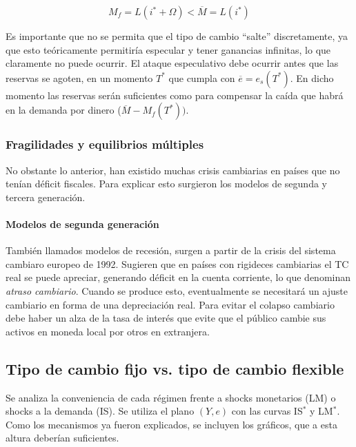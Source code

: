 \documentclass[DeGregorioResumen]{subfiles}
\begin{document}
\begin{equation*}
	M_f = L(i^* + \Omega) < \overline M = L(i^*)
\end{equation*}

Es importante que no se permita que el tipo de cambio ``salte'' discretamente, ya que esto teóricamente permitiría especular y tener ganancias infinitas, lo que claramente no puede ocurrir. El ataque especulativo debe ocurrir antes que las reservas se agoten, en un momento $T^*$ que cumpla con $\overline e = e_s(T^*)$. En dicho momento las reservas serán suficientes como para compensar la caída que habrá en la demanda por dinero ($\overline M - M_f(T^*))$.

\subsubsection{Fragilidades y equilibrios múltiples}

No obstante lo anterior, han existido muchas crisis cambiarias en países que no tenían déficit fiscales. Para explicar esto surgieron los modelos de segunda y tercera generación.

\paragraph{Modelos de segunda generación} También llamados modelos de recesión, surgen a partir de la crisis del sistema cambiaro europeo de 1992. Sugieren que en países con rigideces cambiarias el TC real se puede apreciar, generando déficit en la cuenta corriente, lo que denominan \textit{atraso cambiario}. Cuando se produce esto, eventualmente se necesitará un ajuste cambiario en forma de una depreciación real. Para evitar el colapso cambiario debe haber un alza de la tasa de interés que evite que el público cambie sus activos en moneda local por otros en extranjera.

\subsection{Tipo de cambio fijo vs. tipo de cambio flexible}

Se analiza la conveniencia de cada régimen frente a shocks monetarios (LM) o shocks a la demanda (IS). Se utiliza el plano $(Y, e)$ con las curvas IS$^*$ y LM$^*$. Como los mecanismos ya fueron explicados, se incluyen los gráficos, que a esta altura deberían suficientes.




\end{document}
